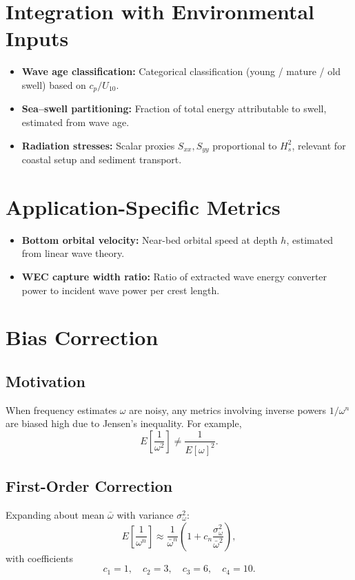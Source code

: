 \documentclass[11pt]{article}
\begin{document}
\section{Integration with Environmental Inputs}

\begin{itemize}
  \item \textbf{Wave age classification:} Categorical classification (young / mature / old swell) based on $c_p/U_{10}$.
  \item \textbf{Sea–swell partitioning:} Fraction of total energy attributable to swell, estimated from wave age.
  \item \textbf{Radiation stresses:} Scalar proxies $S_{xx}, S_{yy}$ proportional to $H_s^2$, relevant for coastal setup and sediment transport.
\end{itemize}

\section{Application-Specific Metrics}

\begin{itemize}
  \item \textbf{Bottom orbital velocity:} Near-bed orbital speed at depth $h$, estimated from linear wave theory.
  \item \textbf{WEC capture width ratio:} Ratio of extracted wave energy converter power to incident wave power per crest length.
\end{itemize}

\section{Bias Correction}

\subsection{Motivation}

When frequency estimates $\omega$ are noisy, any metrics involving inverse powers $1/\omega^n$ are biased high due to Jensen’s inequality.  
For example,
\[
E\!\left[\frac{1}{\omega^2}\right] \neq \frac{1}{E[\omega]^2}.
\]

\subsection{First-Order Correction}

Expanding about mean $\bar{\omega}$ with variance $\sigma_\omega^2$:
\[
E\!\left[\frac{1}{\omega^n}\right] \approx \frac{1}{\bar{\omega}^n}
\left(1 + c_n \frac{\sigma_\omega^2}{\bar{\omega}^2}\right),
\]
with coefficients
\[
c_1 = 1,\quad c_2 = 3,\quad c_3 = 6,\quad c_4 = 10.
\]
\end{document}
